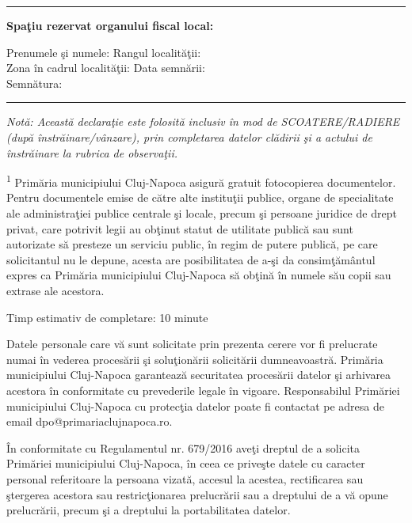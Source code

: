 \documentclass[10pt,a4paper]{article}
\newcommand{\fillline}[1][6cm]{\underline{\hspace{#1}}}
\begin{document}
\vspace{0.4cm}

\hrule
\vspace{0.2cm}

\textbf{Spaţiu rezervat organului fiscal local:}

\vspace{0.2cm}

Prenumele şi numele: \fillline[6cm] Rangul localităţii: \fillline[3cm]\\
Zona în cadrul localităţii: \fillline[4cm] Data semnării: \fillline[3cm]\\
Semnătura: \fillline[6cm]

\vspace{0.4cm}
\hrule
\vspace{0.2cm}

\footnotesize
\textit{Notă: Această declaraţie este folosită inclusiv în mod de SCOATERE/RADIERE (după înstrăinare/vânzare), prin completarea datelor clădirii şi a actului de înstrăinare la rubrica de observaţii.}

\vspace{0.3cm}

\textsuperscript{1} Primăria municipiului Cluj-Napoca asigură gratuit fotocopierea documentelor.\\
Pentru documentele emise de către alte instituţii publice, organe de specialitate ale administraţiei publice centrale şi locale, precum şi persoane juridice de drept privat, care potrivit legii au obţinut statut de utilitate publică sau sunt autorizate să presteze un serviciu public, în regim de putere publică, pe care solicitantul nu le depune, acesta are posibilitatea de a-şi da consimţământul expres ca Primăria municipiului Cluj-Napoca să obţină în numele său copii sau extrase ale acestora.

\vspace{0.3cm}

Timp estimativ de completare: 10 minute

\vspace{0.2cm}

Datele personale care vă sunt solicitate prin prezenta cerere vor fi prelucrate numai în vederea procesării şi soluţionării solicitării dumneavoastră. Primăria municipiului Cluj-Napoca garantează securitatea procesării datelor şi arhivarea acestora în conformitate cu prevederile legale în vigoare. Responsabilul Primăriei municipiului Cluj-Napoca cu protecţia datelor poate fi contactat pe adresa de email dpo@primariaclujnapoca.ro.

În conformitate cu Regulamentul nr. 679/2016 aveţi dreptul de a solicita Primăriei municipiului Cluj-Napoca, în ceea ce priveşte datele cu caracter personal referitoare la persoana vizată, accesul la acestea, rectificarea sau ştergerea acestora sau restricţionarea prelucrării sau a dreptului de a vă opune prelucrării, precum şi a dreptului la portabilitatea datelor.
\end{document}
